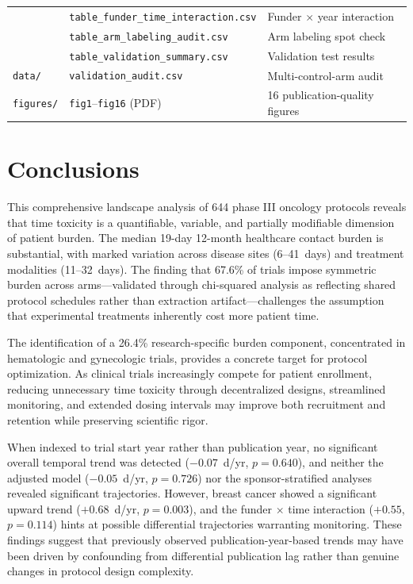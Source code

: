 \documentclass[11pt,a4paper]{article}
\begin{document}
\begin{longtable}{lll}
 & \texttt{table\_funder\_time\_interaction.csv} & Funder $\times$ year interaction \\
 & \texttt{table\_arm\_labeling\_audit.csv} & Arm labeling spot check \\
 & \texttt{table\_validation\_summary.csv} & Validation test results \\
\addlinespace
\texttt{data/} & \texttt{validation\_audit.csv} & Multi-control-arm audit \\
\addlinespace
\texttt{figures/} & \texttt{fig1}--\texttt{fig16} (PDF) & 16 publication-quality figures \\
\bottomrule
\end{longtable}

\section{Conclusions}

This comprehensive landscape analysis of 644 phase III oncology protocols reveals that time toxicity is a quantifiable, variable, and partially modifiable dimension of patient burden. The median 19-day 12-month healthcare contact burden is substantial, with marked variation across disease sites (6--41~days) and treatment modalities (11--32~days). The finding that 67.6\% of trials impose symmetric burden across arms---validated through chi-squared analysis as reflecting shared protocol schedules rather than extraction artifact---challenges the assumption that experimental treatments inherently cost more patient time.

The identification of a 26.4\% research-specific burden component, concentrated in hematologic and gynecologic trials, provides a concrete target for protocol optimization. As clinical trials increasingly compete for patient enrollment, reducing unnecessary time toxicity through decentralized designs, streamlined monitoring, and extended dosing intervals may improve both recruitment and retention while preserving scientific rigor.

When indexed to trial start year rather than publication year, no significant overall temporal trend was detected ($-0.07$~d/yr, $p=0.640$), and neither the adjusted model ($-0.05$~d/yr, $p=0.726$) nor the sponsor-stratified analyses revealed significant trajectories. However, breast cancer showed a significant upward trend ($+0.68$~d/yr, $p=0.003$), and the funder $\times$ time interaction ($+0.55$, $p=0.114$) hints at possible differential trajectories warranting monitoring. These findings suggest that previously observed publication-year-based trends may have been driven by confounding from differential publication lag rather than genuine changes in protocol design complexity.
\end{document}
